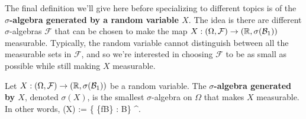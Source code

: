 The final definition we'll give here before specializing to different topics is of the \textbf{$\sigma$-algebra generated by a random variable $X$}. The idea is there are different $\sigma$-algebras $\mathcal F$ that can be chosen to make the map $X : (\Omega, \mathcal F)\rightarrow (\mathbb R, \sigma(\mathcal{B}_{1}))$ measurable. Typically, the random variable cannot distinguish between all the measurable sets in $\mathcal F$, and so we're interested in choosing $\mathcal F$ to be as small as possible while still making $X$ measurable. 

\begin{definition}
	Let $X : (\Omega, \mathcal F) \rightarrow (\mathbb R, \sigma(\mathcal{B}_{1}))$ be a random variable. The \textbf{$\sigma$-algebra generated by $X$}, denoted $\sigma(X)$, is the smallest $\sigma$-algebra on $\Omega$ that makes $X$ measurable. In other words,
	\eq
		\sigma(X) := \left\{ \{f\in B\} : B\in \sigB \right\} ^\Omega.
		\label{eq:gen_sig_alg}
	\qe
\end{definition}

